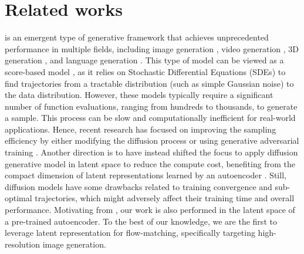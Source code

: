 \documentclass{article}
\newcommand{\minisection}[1]{\vspace{2mm}\noindent{\textbf{#1}}}
\theoremstyle{plain}
\theoremstyle{definition}
\theoremstyle{remark}
\begin{document}
\section{Related works}
\minisection{Diffusion models} \cite{sohl2015deep} is an emergent type of generative framework that achieves unprecedented performance in multiple fields, including image generation \cite{ho2020denoising, nichol2021improved, song2021denoising, dhariwal2021diffusion, Peebles2022DiT}, video generation \cite{ho2022video,ho2022imagen}, 3D generation \cite{luo2021diffusion}, and language generation \cite{dieleman2023language,li2022diffusion}. This type of model can be viewed as a score-based model \cite{song2019generative, song2020improved, song2020score, vincent2011connection}, as it relies on Stochastic Differential Equations (SDEs) to find trajectories from a tractable distribution (such as simple Gaussian noise) to the data distribution.
However, these models typically require a significant number of function evaluations, ranging from hundreds to thousands, to generate a sample. This process can be slow and computationally inefficient for real-world applications. Hence, recent research has focused on improving the sampling efficiency by either modifying the diffusion process \cite{song2021denoising, zhang2023fast, karras2022elucidating,song2023consistency} or using generative adversarial training \cite{xiao2021tackling,phung2023wavediff}. Another direction is to have instead shifted the focus to apply diffusion generative model in latent space to reduce the compute cost, benefiting from the compact dimension of latent representations learned by an autoencoder  \cite{rombach2022high, vahdat2021scorebased, sinha2021d2c}. Still, diffusion models have some drawbacks related to training convergence and sub-optimal trajectories, which might adversely affect their training time and overall performance.  Motivating from \cite{rombach2022high, vahdat2021scorebased, sinha2021d2c}, our work is also performed in the latent space of a pre-trained autoencoder. To the best of our knowledge, we are the first to leverage latent representation for flow-matching, specifically targeting high-resolution image generation.
\end{document}
